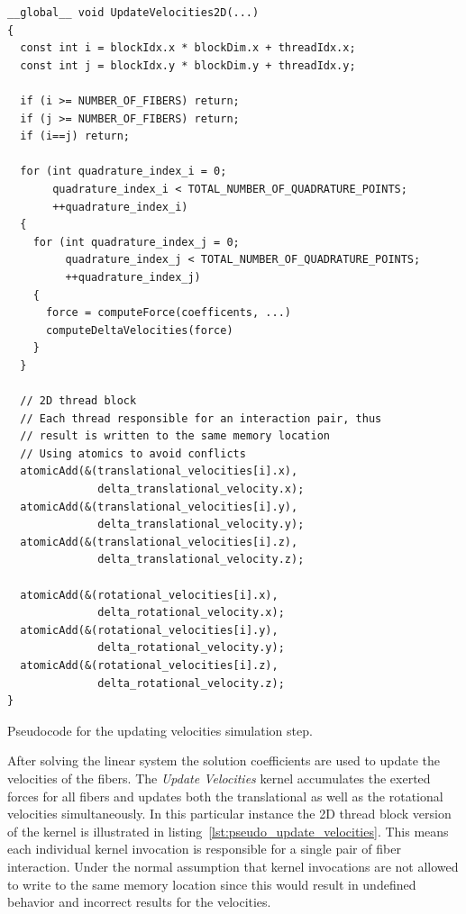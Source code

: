 \documentclass[a4paper,11pt]{kth-mag}
\begin{document}
\begin{listing}[!htbp]
  \centering
  \begin{verbatim}
__global__ void UpdateVelocities2D(...)
{
  const int i = blockIdx.x * blockDim.x + threadIdx.x;
  const int j = blockIdx.y * blockDim.y + threadIdx.y;

  if (i >= NUMBER_OF_FIBERS) return;
  if (j >= NUMBER_OF_FIBERS) return;
  if (i==j) return;

  for (int quadrature_index_i = 0;
       quadrature_index_i < TOTAL_NUMBER_OF_QUADRATURE_POINTS;
       ++quadrature_index_i)
  {
    for (int quadrature_index_j = 0;
         quadrature_index_j < TOTAL_NUMBER_OF_QUADRATURE_POINTS;
         ++quadrature_index_j)
    {
      force = computeForce(coefficents, ...)
      computeDeltaVelocities(force)
    }
  }

  // 2D thread block
  // Each thread responsible for an interaction pair, thus
  // result is written to the same memory location
  // Using atomics to avoid conflicts
  atomicAdd(&(translational_velocities[i].x),
              delta_translational_velocity.x);
  atomicAdd(&(translational_velocities[i].y),
              delta_translational_velocity.y);
  atomicAdd(&(translational_velocities[i].z),
              delta_translational_velocity.z);

  atomicAdd(&(rotational_velocities[i].x),
              delta_rotational_velocity.x);
  atomicAdd(&(rotational_velocities[i].y),
              delta_rotational_velocity.y);
  atomicAdd(&(rotational_velocities[i].z),
              delta_rotational_velocity.z);
}
  \end{verbatim}
  \caption{Pseudocode for the updating velocities simulation step.}
  \label{lst:pseudo_update_velocities}
\end{listing}

After solving the linear system the solution coefficients are used to update the velocities of the fibers. The \emph{Update Velocities} kernel accumulates the exerted forces for all fibers and updates both the translational as well as the rotational velocities simultaneously. In this particular instance the 2D thread block version of the kernel is illustrated in listing~\ref{lst:pseudo_update_velocities}. This means each individual kernel invocation is responsible for a single pair of fiber interaction. Under the normal assumption that kernel invocations are not allowed to write to the same memory location since this would result in undefined behavior and incorrect results for the velocities.
\end{document}
